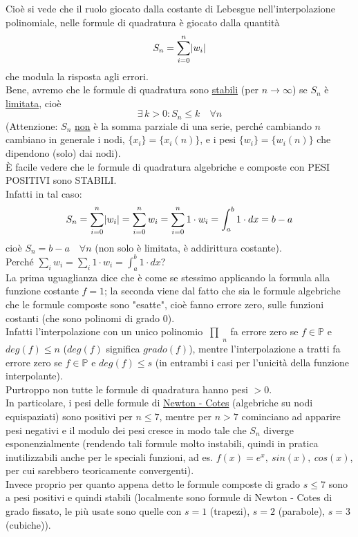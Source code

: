 \documentclass[12pt,a4paper]{article}
\DeclarePairedDelimiter{\abs}{\lvert}{\rvert}
\newcommand{\inter}{\begin{matrix}\prod\end{matrix}}
\begin{document}
Cioè si vede che il ruolo giocato dalla costante di Lebesgue nell'interpolazione polinomiale, nelle formule di quadratura è giocato dalla quantità
\[S_n = \sum_{i=0}^n \abs*{w_i}\]
che modula la risposta agli errori.\\
Bene, avremo che le formule di quadratura sono \underline{stabili} (per $n \to \infty$) se $S_n$ è \underline{limitata}, cioè
\[\exists\, k > 0 : S_n \le k \quad \forall n\]
(Attenzione: $S_n$ \underline{non} è la somma parziale di una serie, perché cambiando $n$ cambiano in generale i nodi, $\{x_i\} = \{x_i(n)\}$, e i pesi $\{w_i\} = \{w_i(n)\}$ che dipendono (solo) dai nodi). \\
È facile vedere che le formule di quadratura algebriche e composte con PESI POSITIVI sono STABILI.\\
Infatti in tal caso:
\[S_n = \sum_{i=0}^n \abs*{w_i} = \sum_{i=0}^n w_i = \sum_{i=0}^n 1 \cdot w_i = \int_a^b 1 \cdot dx = b - a\]
cioè $S_n = b-a \quad \forall n$ (non solo è limitata, è addirittura costante).\\
Perché $\sum_i w_i = \sum_i 1 \cdot w_i = \int_a^b 1 \cdot dx$?\\
La prima uguaglianza dice che è come se stessimo applicando la formula alla funzione costante $f=1$; la seconda viene dal fatto
che sia le formule algebriche che le formule composte sono "esatte", cioè fanno errore zero, sulle funzioni costanti (che sono polinomi di grado 0).\\
Infatti l'interpolazione con un unico polinomio $\inter_n$ fa errore zero se $f \in \mathbb{P}$ e $deg(f) \le n$ ($deg(f)$ significa $grado(f)$), mentre l'interpolazione a tratti fa errore zero se $f \in \mathbb{P}$ e $deg(f) \le s$ (in entrambi i casi per l'unicità della funzione interpolante).\\
Purtroppo non tutte le formule di quadratura hanno pesi $>0$.\\
In particolare, i pesi delle formule di \underline{Newton - Cotes} (algebriche su nodi equispaziati) sono positivi per $n \le 7$, mentre per $n>7$ cominciano ad apparire pesi negativi e il modulo dei pesi cresce in modo tale che $S_n$ diverge esponenzialmente (rendendo tali formule molto instabili, quindi in pratica inutilizzabili anche per le speciali funzioni, ad es. $f(x) = e^x, \ sin(x), \ cos(x)$, per cui sarebbero teoricamente convergenti).\\
Invece proprio per quanto appena detto le formule composte di grado $s \le 7$ sono a pesi positivi e quindi stabili (localmente sono formule di Newton - Cotes di grado fissato, le più usate sono quelle con $s=1$ (trapezi), $s=2$ (parabole), $s=3$ (cubiche)).\\
\end{document}
